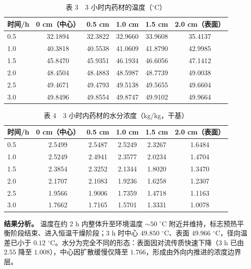 \begin{table}[H]
  \centering
  \caption{表 3　3 小时内药材的温度（$^\circ$C）}
  \label{tab:p2_T}
  \begin{tabular}{lccccc}
    \toprule
    时间/h & 0 cm（中心） & 0.5 cm & 1.0 cm & 1.5 cm & 2.0 cm（表面） \\
    \midrule
    0.5 & 32.1894 & 32.3822 & 32.9660 & 33.9608 & 35.4137 \\
    1.0 & 40.3818 & 40.5538 & 41.0609 & 41.8790 & 42.9985 \\
    1.5 & 45.8470 & 45.9351 & 46.1934 & 46.6056 & 47.1412 \\
    2.0 & 48.4504 & 48.4883 & 48.5987 & 48.7739 & 49.0038 \\
    2.5 & 49.4671 & 49.4793 & 49.5138 & 49.5655 & 49.6604 \\
    3.0 & 49.8496 & 49.8554 & 49.8747 & 49.9102 & 49.9664 \\
    \bottomrule
  \end{tabular}
\end{table}

\begin{table}[H]
  \centering
  \caption{表 4　3 小时内药材的水分浓度（kg/kg，干基）}
  \label{tab:p2_C}
  \begin{tabular}{lccccc}
    \toprule
    时间/h & 0 cm（中心） & 0.5 cm & 1.0 cm & 1.5 cm & 2.0 cm（表面） \\
    \midrule
    0.5 & 2.5499 & 2.5487 & 2.5249 & 2.3267 & 1.6484 \\
    1.0 & 2.5249 & 2.4941 & 2.3577 & 2.0234 & 1.4704 \\
    1.5 & 2.3854 & 2.3252 & 2.1344 & 1.8020 & 1.3470 \\
    2.0 & 2.1707 & 2.1083 & 1.9236 & 1.6258 & 1.2307 \\
    2.5 & 1.9566 & 1.9006 & 1.7359 & 1.4718 & 1.1163 \\
    3.0 & 1.7662 & 1.7165 & 1.5701 & 1.3331 & 1.0078 \\
    \bottomrule
  \end{tabular}
\end{table}

\textbf{结果分析。} 温度在约 $2$ h 内整体升至环境温度 $\sim50$ $^\circ$C 附近并维持，标志预热平衡阶段结束、进入恒温干燥阶段；$3$ h 时中心 $49.850$ $^\circ$C、表面 $49.966$ $^\circ$C，径向温差已小于 $0.12$ $^\circ$C。水分为完全不同的形态：表面因对流传质快速下降（$3$ h 已由 $2.55$ 降至 $1.008$），中心因扩散缓慢仅降至 $1.766$，形成由外向内推进的浓度边界层。

